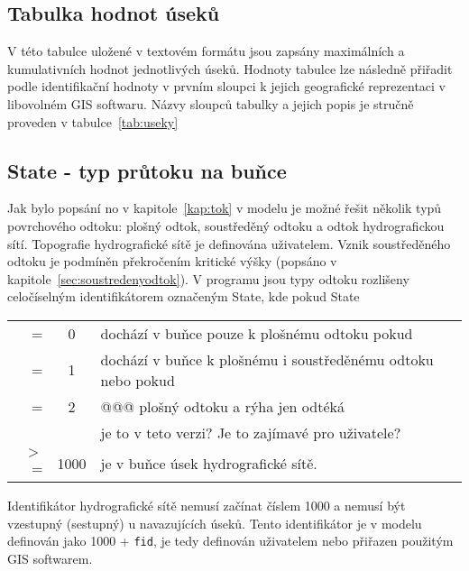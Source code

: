 % 


% 



\subsection{Tabulka hodnot úseků}\label{sec:toktext}
V této tabulce uložené v textovém formátu jsou zapsány maximálních a kumulativních hodnot jednotlivých úseků. Hodnoty tabulce lze následně přiřadit podle identifikační hodnoty v prvním sloupci k jejich geografické reprezentaci v libovolném GIS softwaru. Názvy sloupců tabulky a jejich popis je stručně proveden v tabulce~\ref{tab:useky}



% 



\subsection{State - typ průtoku na buňce}\label{sec:statpopis}
  Jak bylo popsání no v kapitole~\ref{kap:tok} v modelu je možné řešit několik typů povrchového odtoku: plošný odtok, soustředěný odtoku a odtok hydrografickou sítí. Topografie hydrografické sítě je definována uživatelem. Vznik soustředěného odtoku je podmíněn překročením kritické výšky (popsáno v kapitole~\ref{sec:soustredenyodtok}). V programu jsou typy odtoku rozlišeny celočíselným identifikátorem označeným State, kde pokud State\\
%   
  \begin{tabular}{rcl}
     =     &0&  dochází v buňce pouze k plošnému odtoku pokud \\
     =     &1&  dochází v buňce k plošnému i soustředěnému odtoku  nebo pokud \\
     =     &2&  @@@ plošný odtoku a rýha jen odtéká \\
     && je to v teto verzi? Je to zajímavé pro uživatele? \\
     $>$=  &1000&  je v buňce úsek hydrografické sítě. \\
  \end{tabular}

  Identifikátor hydrografické sítě nemusí začínat číslem 1000 a nemusí být vzestupný (sestupný) u navazujících úseků. Tento identifikátor je v modelu definován jako 1000 + {\tt fid}, je tedy definován uživatelem nebo přiřazen použitým GIS softwarem. 




